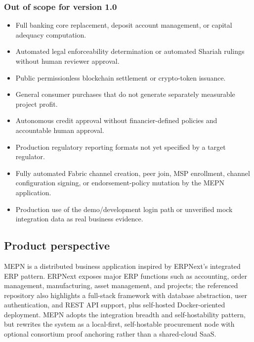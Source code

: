 \documentclass[11pt,a4paper]{article}
\newcommand{\systemshort}{MEPN}
\begin{document}
\subsubsection{Out of scope for version 1.0}
\begin{itemize}
  \item Full banking core replacement, deposit account management, or capital adequacy computation.
  \item Automated legal enforceability determination or automated Shariah rulings without human reviewer approval.
  \item Public permissionless blockchain settlement or crypto-token issuance.
  \item General consumer purchases that do not generate separately measurable project profit.
  \item Autonomous credit approval without financier-defined policies and accountable human approval.
  \item Production regulatory reporting formats not yet specified by a target regulator.
  \item Fully automated Fabric channel creation, peer join, MSP enrollment, channel configuration signing, or endorsement-policy mutation by the MEPN application.
  \item Production use of the demo/development login path or unverified mock integration data as real business evidence.
\end{itemize}

\subsection{Product perspective}
\systemshort{} is a distributed business application inspired by ERPNext's integrated ERP pattern. ERPNext exposes major ERP functions such as accounting, order management, manufacturing, asset management, and projects; the referenced repository also highlights a full-stack framework with database abstraction, user authentication, and REST API support, plus self-hosted Docker-oriented deployment. \systemshort{} adopts the integration breadth and self-hostability pattern, but rewrites the system as a local-first, self-hostable procurement node with optional consortium proof anchoring rather than a shared-cloud SaaS.
\end{document}
